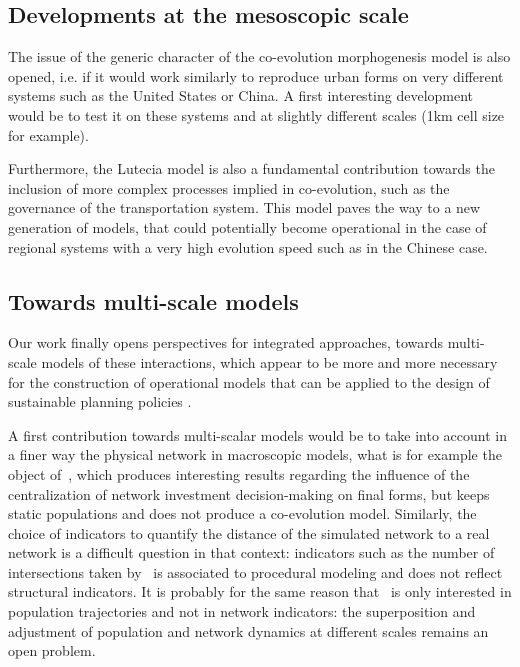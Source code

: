 \documentclass[11pt]{article}
\begin{document}
\subsection{Developments at the mesoscopic scale}


The issue of the generic character of the co-evolution morphogenesis model is also opened, i.e. if it would work similarly to reproduce urban forms on very different systems such as the United States or China. A first interesting development would be to test it on these systems and at slightly different scales (1km cell size for example).


Furthermore, the Lutecia model is also a fundamental contribution towards the inclusion of more complex processes implied in co-evolution, such as the governance of the transportation system. This model paves the way to a new generation of models, that could potentially become operational in the case of regional systems with a very high evolution speed such as in the Chinese case.


\subsection{Towards multi-scale models}


Our work finally opens perspectives for integrated approaches, towards multi-scale models of these interactions, which appear to be more and more necessary for the construction of operational models that can be applied to the design of sustainable planning policies \citep{rozenblat2018conclusion}.


A first contribution towards multi-scalar models would be to take into account in a finer way the physical network in macroscopic models, what is for example the object of~\cite{mimeur:tel-01451164}, which produces interesting results regarding the influence of the centralization of network investment decision-making on final forms, but keeps static populations and does not produce a co-evolution model. Similarly, the choice of indicators to quantify the distance of the simulated network to a real network is a difficult question in that context: indicators such as the number of intersections taken by~\cite{mimeur:tel-01451164} is associated to procedural modeling and does not reflect structural indicators. It is probably for the same reason that~\cite{schmitt2014modelisation} is only interested in population trajectories and not in network indicators: the superposition and adjustment of population and network dynamics at different scales remains an open problem.
\end{document}
